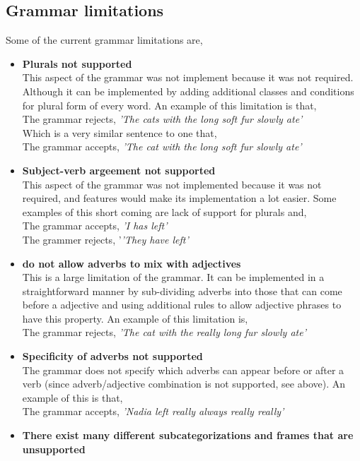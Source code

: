 \documentclass{article}
\begin{document}
\subsection{Grammar limitations}
\label{limits}
Some of the current grammar limitations are,
\begin{itemize}
\item \textbf{Plurals not supported}\\
This aspect of the grammar was not implement because it was not required. Although it can be implemented by adding additional classes and conditions for plural form of every word. An example of this limitation is that, \\
The grammar rejects, \textit{'The cats with the long soft fur slowly ate'}\\
Which is a very similar sentence to one that, \\
The grammar accepts, \textit{'The cat with the long soft fur slowly ate'}
\item \textbf{Subject-verb argeement not supported}\\
This aspect of the grammar was not implemented because it was not required, and features would make its implementation a lot easier. Some examples of this short coming are lack of support for plurals and,\\
The grammar accepts, \textit{'I has left'}\\
The grammer rejects, '\textit{'They have left'}
\item \textbf{do not allow adverbs to mix with adjectives}\\
This is a large limitation of the grammar. It can be implemented in a straightforward manner by sub-dividing adverbs into those that can come before a adjective and using additional rules to allow adjective phrases to have this property. An example of this limitation is,\\
The grammar rejects, \textit{'The cat with the really long fur slowly ate'}
\item \textbf{Specificity of adverbs not supported}\\
The grammar does not specify which adverbs can appear before or after a verb (since adverb/adjective combination is not supported, see above). An example of this is that,\\
The grammar accepts, \textit{'Nadia left really always really really'}
\item \textbf{There exist many different subcategorizations and frames that are unsupported} \\

\end{itemize}
\end{document}
